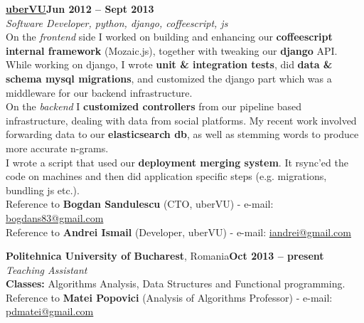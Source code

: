 \documentclass[margin,line]{resume}
\begin{document}
\begin{resume}
	\vspace{1.2mm}\href{http://www.ubervu.com}{\textbf{uberVU}}\hfill \textbf{Jun 2012 -- Sept 2013}\vspace{1.2mm}\\
	\vspace{1mm} \textsl{Software Developer, python, django, coffeescript, js}\vspace{1.5mm}\\
	On the \textit{frontend} side I worked on building and enhancing our \textbf{coffeescript internal framework} (Mozaic.js), together with tweaking our \textbf{django} API. While working on django, I wrote \textbf{unit \& integration tests}, did \textbf{data \& schema mysql migrations}, and customized the django part which was a middleware for our backend infrastructure.\\
	On the \textit{backend} I \textbf{customized controllers} from our pipeline based infrastructure, dealing with data from social platforms. My recent work involved forwarding data to our \textbf{elasticsearch db}, as well as stemming words to produce more accurate n-grams.\\
	I wrote a script that used our \textbf{deployment merging system}. It rsync'ed the code on machines and then did application specific steps (e.g. migrations, bundling js etc.).\vspace{1.5mm}\\
	\small{Reference to \textbf{Bogdan Sandulescu} (CTO, uberVU) - e-mail: \href{mailto:bogdans83@gmail.com}{bogdans83@gmail.com}}\\
	\small{Reference to \textbf{Andrei Ismail} (Developer, uberVU) - e-mail: \href{mailto:iandrei@gmail.com}{iandrei@gmail.com}}

	\vspace{1.2mm}\textbf{Politehnica University of Bucharest}, Romania\hfill \textbf{Oct 2013 -- present}\vspace{1.2mm}\\
	\vspace{1mm} \textsl{Teaching Assistant}\vspace{1.5mm}\\
	\textbf{Classes:} Algorithms Analysis, Data Structures and Functional programming.\vspace{1.5mm}\\
	\small{Reference to \textbf{Matei Popovici} (Analysis of Algorithms Professor) - e-mail: \href{mailto:pdmatei@gmail.com}{pdmatei@gmail.com}}


\end{resume}
\end{document}
